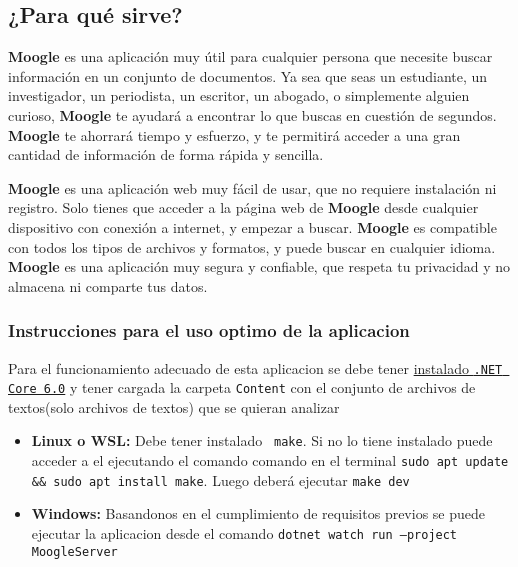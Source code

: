 \documentclass[a4paper, 12pt]{report}
\begin{document}
\subsection*{¿Para qué sirve?}

{\bf Moogle} es una aplicación muy útil para cualquier persona que necesite buscar información en un conjunto de documentos.
 Ya sea que seas un estudiante, un investigador, un periodista, un escritor, un abogado, o simplemente alguien curioso, {\bf Moogle} te ayudará a encontrar lo que buscas en cuestión de segundos. 
{\bf Moogle} te ahorrará tiempo y esfuerzo, y te permitirá acceder a una gran cantidad de información de forma rápida y sencilla.



{\bf Moogle} es una aplicación web muy fácil de usar, que no requiere instalación ni registro. 
Solo tienes que acceder a la página web de {\bf Moogle} desde cualquier dispositivo con conexión a internet, y empezar a buscar. {\bf Moogle}
 es compatible con todos los tipos de archivos y formatos, y puede buscar en cualquier idioma. 
{\bf Moogle} es una aplicación muy segura y confiable, que respeta tu privacidad y no almacena ni comparte tus datos.



\subsubsection*{Instrucciones para el uso optimo de la aplicacion}		

Para el funcionamiento adecuado de esta aplicacion se debe tener 
\href{https://learn.microsoft.com/es-es/dotnet/core/install/}{instalado {\tt \color{gray45}.NET Core 6.0}} y tener cargada  la carpeta {\tt \color{gray45}Content}  con el conjunto de archivos de textos(solo archivos de textos) que se quieran analizar 

\begin{itemize}
	\item {\bf Linux o WSL:} Debe tener instalado {\tt \color{gray45} make}. Si no lo tiene instalado
	      puede acceder a el ejecutando el comando comando en el terminal {\tt \color{gray45}sudo apt update \&\& sudo apt install make}. Luego deberá ejecutar {\tt \color{gray45}make dev}

	\item {\bf Windows:} Basandonos en el cumplimiento de requisitos previos se puede ejecutar la aplicacion desde el comando  {\tt \color{gray45}dotnet watch run --project MoogleServer}
\end{itemize}
\end{document}
